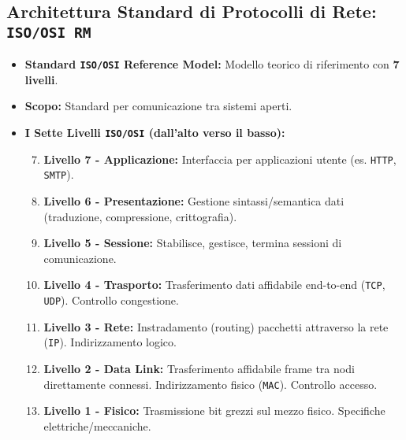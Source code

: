 \subsection{Architettura Standard di Protocolli di Rete: \texttt{ISO/OSI RM}}
\begin{itemize}
    \item \textbf{Standard \texttt{ISO/OSI} Reference Model:} Modello teorico di riferimento con \textbf{7 livelli}.
    \item \textbf{Scopo:} Standard per comunicazione tra sistemi aperti.
    \item \textbf{I Sette Livelli \texttt{ISO/OSI} (dall'alto verso il basso):}
    \begin{enumerate}[label=\arabic*.]
        \setcounter{enumi}{6} %
        \item \textbf{Livello 7 - Applicazione:} Interfaccia per applicazioni utente (es. \texttt{HTTP}, \texttt{SMTP}).
        \item \textbf{Livello 6 - Presentazione:} Gestione sintassi/semantica dati (traduzione, compressione, crittografia).
        \item \textbf{Livello 5 - Sessione:} Stabilisce, gestisce, termina sessioni di comunicazione.
        \item \textbf{Livello 4 - Trasporto:} Trasferimento dati affidabile end-to-end (\texttt{TCP}, \texttt{UDP}). Controllo congestione.
        \item \textbf{Livello 3 - Rete:} Instradamento (routing) pacchetti attraverso la rete (\texttt{IP}). Indirizzamento logico.
        \item \textbf{Livello 2 - Data Link:} Trasferimento affidabile frame tra nodi direttamente connessi. Indirizzamento fisico (\texttt{MAC}). Controllo accesso.
        \item \textbf{Livello 1 - Fisico:} Trasmissione bit grezzi sul mezzo fisico. Specifiche elettriche/meccaniche.
    \end{enumerate}
\end{itemize}


